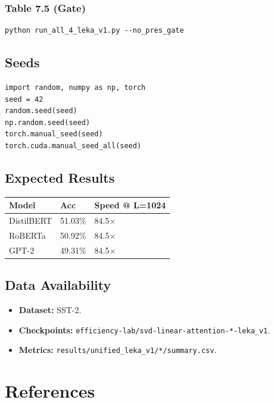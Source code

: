 \subsubsection{Table 7.5 (Gate)}
\begin{lstlisting}
python run_all_4_leka_v1.py --no_pres_gate
\end{lstlisting}

\subsection{Seeds}

\begin{lstlisting}
import random, numpy as np, torch
seed = 42
random.seed(seed)
np.random.seed(seed)
torch.manual_seed(seed)
torch.cuda.manual_seed_all(seed)
\end{lstlisting}

\subsection{Expected Results}

\begin{table}[H]
\centering
\small
\begin{tabular}{lll}
\toprule
\textbf{Model} & \textbf{Acc} & \textbf{Speed @ L=1024} \\
\midrule
DistilBERT & 51.03\% & 84.5$\times$ \\
RoBERTa & 50.92\% & 84.5$\times$ \\
GPT-2 & 49.31\% & 84.5$\times$ \\
\bottomrule
\end{tabular}
\end{table}

\subsection{Data Availability}

\begin{itemize}
\item \textbf{Dataset:} SST-2.
\item \textbf{Checkpoints:} \texttt{efficiency-lab/svd-linear-attention-*-leka\_v1}.
\item \textbf{Metrics:} \texttt{results/unified\_leka\_v1/*/summary.csv}.

\end{itemize}


\section{References}

